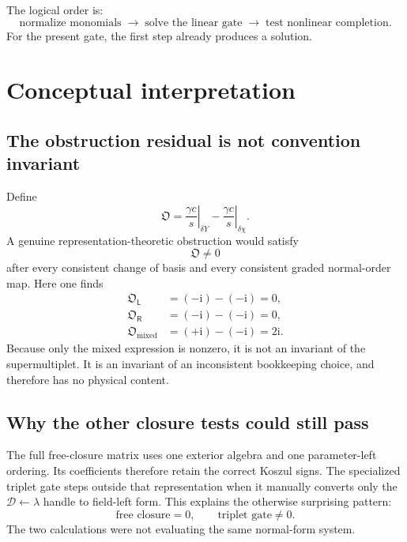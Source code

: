 \documentclass[11pt,a4paper,UTF8]{ctexart}
\numberwithin{equation}{section}
\newcommand{\ii}{\mathrm i}
\newcommand{\PL}{\mathsf L}
\newcommand{\PR}{\mathsf R}
\begin{document}
The logical order is:
\begin{equation}
\boxed{
\text{normalize monomials}
\;\longrightarrow\;
\text{solve the linear gate}
\;\longrightarrow\;
\text{test nonlinear completion}.}
\end{equation}
For the present gate, the first step already produces a solution.

\section{Conceptual interpretation}

\subsection{The obstruction residual is not convention invariant}

Define
\begin{equation}
\mathfrak O
=
\left.\frac{\gamma c}{s}\right|_{\delta Y}
-
\left.\frac{\gamma c}{s}\right|_{\delta\chi}.
\end{equation}
A genuine representation-theoretic obstruction would satisfy
\[
\mathfrak O\neq0
\]
after every consistent change of basis and every consistent graded normal-order map. Here one finds
\begin{align}
\mathfrak O_{\PL}&=(-\ii)-(-\ii)=0,
\\
\mathfrak O_{\PR}&=(-\ii)-(-\ii)=0,
\\
\mathfrak O_{\text{mixed}}&=(+\ii)-(-\ii)=2\ii.
\end{align}
Because only the mixed expression is nonzero, it is not an invariant of the supermultiplet. It is an invariant of an inconsistent bookkeeping choice, and therefore has no physical content.

\subsection{Why the other closure tests could still pass}

The full free-closure matrix uses one exterior algebra and one parameter-left ordering. Its coefficients therefore retain the correct Koszul signs. The specialized triplet gate steps outside that representation when it manually converts only the $\mathscr D\leftarrow\lambda$ handle to field-left form. This explains the otherwise surprising pattern:
\[
\text{free closure}=0,
\qquad
\text{triplet gate}\neq0.
\]
The two calculations were not evaluating the same normal-form system.
\end{document}

